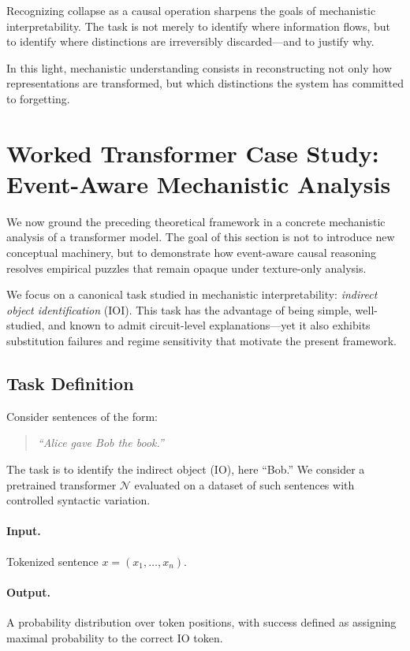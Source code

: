 \documentclass[11pt]{article}
\theoremstyle{remark}
\newcommand{\NN}{\mathcal{N}}
\begin{document}
Recognizing collapse as a causal operation sharpens the goals of
mechanistic interpretability. The task is not merely to identify where
information flows, but to identify where distinctions are irreversibly
discarded—and to justify why.

In this light, mechanistic understanding consists in reconstructing not
only how representations are transformed, but which distinctions the
system has committed to forgetting.

\section{Worked Transformer Case Study: Event-Aware Mechanistic Analysis}

We now ground the preceding theoretical framework in a concrete
mechanistic analysis of a transformer model. The goal of this section
is not to introduce new conceptual machinery, but to demonstrate how
event-aware causal reasoning resolves empirical puzzles that remain
opaque under texture-only analysis.

We focus on a canonical task studied in mechanistic interpretability:
\emph{indirect object identification} (IOI). This task has the advantage
of being simple, well-studied, and known to admit circuit-level
explanations—yet it also exhibits substitution failures and regime
sensitivity that motivate the present framework.

\subsection{Task Definition}

Consider sentences of the form:
\begin{quote}
\emph{``Alice gave Bob the book.''}
\end{quote}

The task is to identify the indirect object (IO), here ``Bob.'' We
consider a pretrained transformer $\NN$ evaluated on a dataset of such
sentences with controlled syntactic variation.

\paragraph{Input.}
Tokenized sentence $x = (x_1, \ldots, x_n)$.

\paragraph{Output.}
A probability distribution over token positions, with success defined
as assigning maximal probability to the correct IO token.
\end{document}
